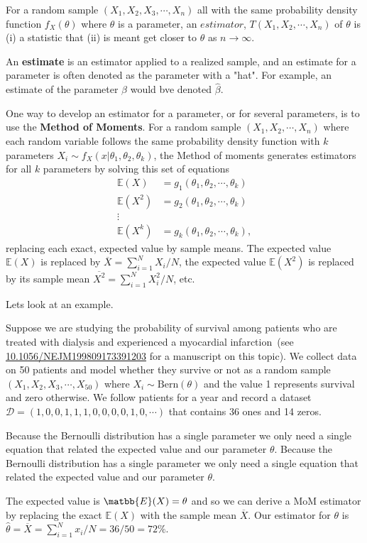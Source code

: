 For a random sample $(X_{1},X_{2},X_{3},\cdots,X_{n})$ all with the same probability density function $f_{X}(\theta)$ where $\theta$ is a parameter, an $estimator$, $T(X_{1},X_{2},\cdots,X_{n})$ of $\theta$ is (i) a statistic that (ii) is meant get closer to $\theta$ as $n \to \infty$.

An \textbf{estimate} is an estimator applied to a realized sample, and an estimate for a parameter is often denoted as the parameter with a "hat". For example, an estimate of the parameter $\beta$ would bve denoted $\hat{\beta}$.

One way to develop an estimator for a parameter, or for several parameters, is to use the \textbf{Method of Moments}.
For a random sample $(X_{1},X_{2},\cdots,X_{n})$ where each random variable follows the same probability density function with $k$ parameters $X_{i} \sim f_{X}(x | \theta_{1},\theta_{2},\theta_{k})$, the Method of moments generates estimators for all $k$ parameters by solving this set of equations 
\begin{align}
    \mathbb{E}(X)     &= g_{1}(\theta_{1},\theta_{2},\cdots,\theta_{k}) \\ 
    \mathbb{E}(X^{2}) &= g_{2}(\theta_{1},\theta_{2},\cdots,\theta_{k}) \\ 
    \vdots \\
    \mathbb{E}(X^{k}) &= g_{k}(\theta_{1},\theta_{2},\cdots,\theta_{k}), 
\end{align}
replacing each exact, expected value by sample means. 
The expected value $\mathbb{E}(X)$ is replaced by $\overline{X} = \sum_{i=1}^{N} X_{i}/N$, the expected value $\mathbb{E}(X^{2})$ is replaced by its sample mean $\overline{X^{2}} = \sum_{i=1}^{N} X_{i}^{2} / N$, etc. 

Lets look at an example. 


\begin{VT1}

Suppose we are studying the probability of survival among patients who are treated with dialysis and experienced a myocardial infarction~(see \url{10.1056/NEJM199809173391203} for a manuscript on this topic). We collect data on 50 patients and model whether they survive or not as a random sample $(X_{1},X_{2},X_{3},\cdots,X_{50})$ where $X_{i} \sim \text{Bern}(\theta)$ and the value 1 represents survival and zero otherwise. We follow patients for a year and record a dataset $\mathcal{D} =(1,0,0,1,1,1,0,0,0,0,1,0,\cdots)$ that contains 36 ones and 14 zeros. 

Because the Bernoulli distribution has a single parameter we only need a single equation that related the expected value and our parameter $\theta$. Because the Bernoulli distribution has a single parameter we only need a single equation that related the expected value and our parameter $\theta$.

The expected value is $\matbb{E}(X) = \theta$ and so we can derive a MoM estimator by replacing the exact $\mathbb{E}(X)$ with the sample mean $\overline{X}$. Our estimator for $\theta$ is $\hat{\theta} = \overline{X} = \sum_{i=1}^{N} x_{i} / N = 36/50 = 72\%$.

\end{VT1}

